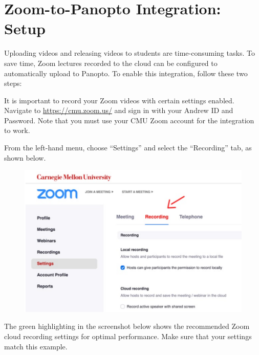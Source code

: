 \section{Zoom-to-Panopto Integration: Setup}
\label{sec:panopto:zoom_to_panopto_integration_set_up}

Uploading videos and releasing videos to students are time-consuming tasks. To save time, Zoom lectures recorded to the cloud can be configured to automatically upload to Panopto. To enable this integration, follow these two steps:

\begin{gram}[Step 1/2]
	It is important to record your Zoom videos with certain settings enabled. Navigate to \href{https://cmu.zoom.us/}{https://cmu.zoom.us/} and sign in with your Andrew ID and Password. Note that you must use your CMU Zoom account for the integration to work.

	From the left-hand menu, choose ``Settings'' and select the ``Recording'' tab, as shown below.

	\begin{figure}[H]
		\centering
		\includegraphics[scale=0.7]{panopto/03-recording.png}
	\end{figure}

	The green highlighting in the screenshot below shows the recommended Zoom cloud recording settings for optimal performance. Make sure that your settings match this example.


\end{gram}
